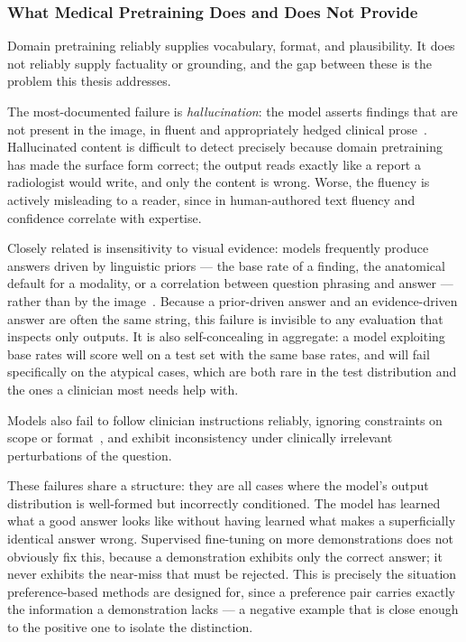 \subsubsection{What Medical Pretraining Does and Does Not Provide}

Domain pretraining reliably supplies vocabulary, format, and plausibility. It does not reliably supply factuality or grounding, and the gap between these is the problem this thesis addresses.

The most-documented failure is \emph{hallucination}: the model asserts findings that are not present in the image, in fluent and appropriately hedged clinical prose~\cite{zhang2024medihall, seth2025hallucinogen}. Hallucinated content is difficult to detect precisely because domain pretraining has made the surface form correct; the output reads exactly like a report a radiologist would write, and only the content is wrong. Worse, the fluency is actively misleading to a reader, since in human-authored text fluency and confidence correlate with expertise.

Closely related is insensitivity to visual evidence: models frequently produce answers driven by linguistic priors --- the base rate of a finding, the anatomical default for a modality, or a correlation between question phrasing and answer --- rather than by the image~\cite{xia2024cares}. Because a prior-driven answer and an evidence-driven answer are often the same string, this failure is invisible to any evaluation that inspects only outputs. It is also self-concealing in aggregate: a model exploiting base rates will score well on a test set with the same base rates, and will fail specifically on the atypical cases, which are both rare in the test distribution and the ones a clinician most needs help with.

Models also fail to follow clinician instructions reliably, ignoring constraints on scope or format~\cite{vadlapati2026ai, xia2024cares}, and exhibit inconsistency under clinically irrelevant perturbations of the question.

These failures share a structure: they are all cases where the model's output distribution is well-formed but incorrectly conditioned. The model has learned what a good answer looks like without having learned what makes a superficially identical answer wrong. Supervised fine-tuning on more demonstrations does not obviously fix this, because a demonstration exhibits only the correct answer; it never exhibits the near-miss that must be rejected. This is precisely the situation preference-based methods are designed for, since a preference pair carries exactly the information a demonstration lacks --- a negative example that is close enough to the positive one to isolate the distinction.


